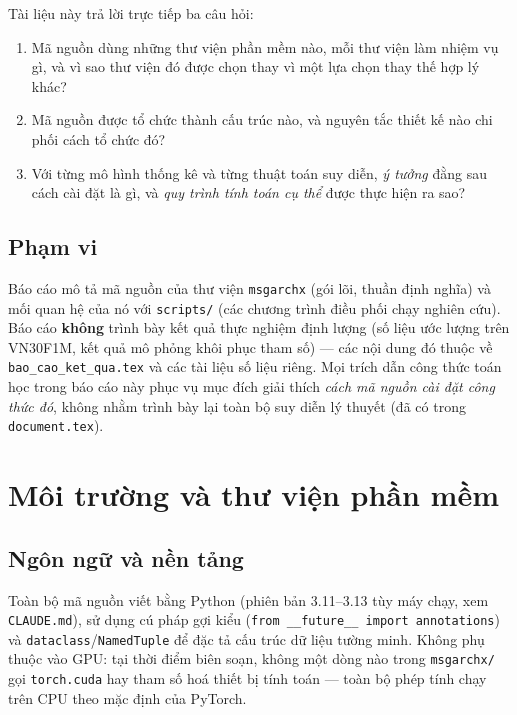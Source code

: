 \documentclass[11pt,a4paper]{article}
\newcommand{\code}[1]{\texttt{#1}}
\newcommand{\file}[1]{\texttt{#1}}
\begin{document}
Tài liệu này trả lời trực tiếp ba câu hỏi:
\begin{enumerate}[label=(\roman*)]
  \item Mã nguồn dùng những thư viện phần mềm nào, mỗi thư viện làm nhiệm vụ gì, và
        vì sao thư viện đó được chọn thay vì một lựa chọn thay thế hợp lý khác?
  \item Mã nguồn được tổ chức thành cấu trúc nào, và nguyên tắc thiết kế nào chi phối
        cách tổ chức đó?
  \item Với từng mô hình thống kê và từng thuật toán suy diễn, \emph{ý tưởng} đằng sau
        cách cài đặt là gì, và \emph{quy trình tính toán cụ thể} được thực hiện ra sao?
\end{enumerate}

\subsection{Phạm vi}

Báo cáo mô tả mã nguồn của thư viện \code{msgarchx} (gói lõi, thuần định nghĩa) và
mối quan hệ của nó với \file{scripts/} (các chương trình điều phối chạy nghiên cứu).
Báo cáo \textbf{không} trình bày kết quả thực nghiệm định lượng (số liệu ước lượng
trên VN30F1M, kết quả mô phỏng khôi phục tham số) --- các nội dung đó thuộc về
\file{bao\_cao\_ket\_qua.tex} và các tài liệu số liệu riêng. Mọi trích dẫn công thức
toán học trong báo cáo này phục vụ mục đích giải thích \emph{cách mã nguồn cài đặt
công thức đó}, không nhằm trình bày lại toàn bộ suy diễn lý thuyết (đã có trong
\file{document.tex}).

\section{Môi trường và thư viện phần mềm}

\subsection{Ngôn ngữ và nền tảng}

Toàn bộ mã nguồn viết bằng Python (phiên bản 3.11--3.13 tùy máy chạy, xem
\file{CLAUDE.md}), sử dụng cú pháp gợi kiểu (\code{from \_\_future\_\_ import
annotations}) và \code{dataclass}/\code{NamedTuple} để đặc tả cấu trúc dữ liệu tường
minh. Không phụ thuộc vào GPU: tại thời điểm biên soạn, không một dòng nào trong
\code{msgarchx/} gọi \code{torch.cuda} hay tham số hoá thiết bị tính toán --- toàn bộ
phép tính chạy trên CPU theo mặc định của PyTorch.
\end{document}
